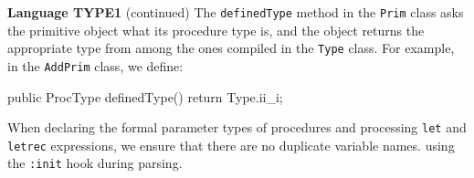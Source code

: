 \begin{minipage}[t]{\sw}
\slidenumber
\LARGE
{\bf Language TYPE1} (continued)\exx
The \verb'definedType' method in the \verb'Prim' class
asks the primitive object what its procedure type is,
and the object returns the appropriate type
from among the ones compiled in the \verb'Type' class.
For example, in the \verb'AddPrim' class,
we define:
{\Large
\begin{qv}
    public ProcType definedType() {
        return Type.ii_i;
    }
\end{qv}
}
When declaring the formal parameter types of procedures
and processing \verb'let' and \verb'letrec' expressions,
we ensure that there are no duplicate variable names.
using the \verb':init' hook during parsing.\exx
\end{minipage}

